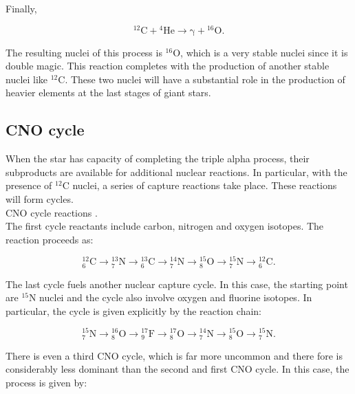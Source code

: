 \documentclass[openany]{book}
\begin{document}
Finally, 

\begin{equation}\label{eq:reaction_tripleAlpha_3}
	\mathrm{{}^{12}C + {}^{4}He \rightarrow \gamma + {}^{16}O}.
\end{equation}

The resulting nuclei of this process is $\mathrm{{}^{16}O}$, which is a very stable nuclei since it is double magic. This reaction completes with the production of another stable nuclei like $\mathrm{{}^{12}C}$. These two nuclei will have a substantial role in the production of heavier elements at the last stages of giant stars.

\subsection{CNO cycle}  \label{sub:CNOCycle}

When the star has capacity of completing the triple alpha process, their subproducts are available for additional nuclear reactions. In particular, with the presence of $\mathrm{{}^{12}C}$ nuclei, a series of capture reactions take place. These reactions will form cycles. \\

CNO cycle reactions \cite{wiescher_gorres_schatz_1999}. \\

 The first cycle reactants include carbon, nitrogen and oxygen isotopes. The reaction proceeds as:  

\begin{equation} \label{eq:reaction_CNO_C}
	\mathrm{{}_{6}^{12}C  \rightarrow {}^{13}_{7}N  \rightarrow {}^{13}_{6}C  \rightarrow {}^{14}_{7}N  \rightarrow {}^{15}_{8}O  \rightarrow {}^{15}_{7}N \rightarrow {}^{12}_{6}C}.
\end{equation}

The last cycle fuels another nuclear capture cycle. In this case, the starting point are $\mathrm{{}^{15}N}$ nuclei and the cycle also involve oxygen and fluorine isotopes. In particular, the cycle is given explicitly by the reaction chain: 

\begin{equation} \label{eq:reaction_CNO_N}
	\mathrm{{}_{7}^{15}N  \rightarrow {}^{16}_{8}O  \rightarrow {}^{17}_{9}F  \rightarrow {}^{17}_{8}O  \rightarrow {}^{14}_{7}N  \rightarrow {}^{15}_{8}O \rightarrow {}^{15}_{7}N  }.
\end{equation}

There is even a third CNO cycle, which is far more uncommon and there fore is considerably less dominant than the second and first CNO cycle. In this case, the process is given by: 
\end{document}
